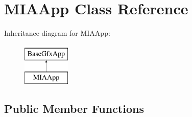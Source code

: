 \hypertarget{classMIAApp}{\section{M\-I\-A\-App Class Reference}
\label{classMIAApp}
}
Inheritance diagram for M\-I\-A\-App\-:\begin{figure}[H]
\begin{center}
\leavevmode
\includegraphics[height=2.000000cm]{classMIAApp}
\end{center}
\end{figure}
\subsection*{Public Member Functions}
